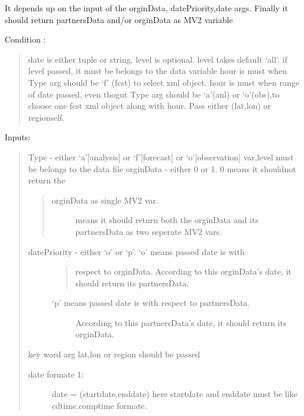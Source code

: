 \documentclass[letterpaper,10pt,english]{sphinxmanual}
\begin{document}
\begin{fulllineitems}
\begin{fulllineitems}
It depends up on the input of the orginData, datePriority,date args.
Finally it should return partnersData and/or orginData as MV2 variable

Condition :
\begin{quote}

date is either tuple or string.
level is optional. level takes default `all'.
if level passed, it must be belongs to the data variable
hour is must when Type arg should be `f' (fcst) to select xml object.
hour is must when range of date passed, even thogut Type arg should
be `a'(anl) or `o'(obs),to choose one fcst xml object along with hour.
Pass either (lat,lon) or regionself.
\end{quote}

Inputs:
\begin{quote}

Type - either `a'{[}analysis{]} or `f'{[}forecast{]} or `o'{[}observation{]}
var,level must be belongs to the data file
orginData - either 0 or 1. 0 means it shouldnot return the
\begin{quote}
\begin{description}
\item[{orginData as single MV2 var.}]  means it should return both the orginData and its
partnersData as two seperate MV2 vars.

\end{description}
\end{quote}
\begin{description}
\item[{datePriority - either `o' or `p'. `o' means passed date is with}] \leavevmode\begin{quote}

respect to orginData. According to this
orginData's date, it should return its partnersData.
\end{quote}
\begin{description}
\item[{`p' means passed date is with respect to partnersData.}] \leavevmode
According to this partnersData's date, it should
return its orginData.

\end{description}

\end{description}

key word arg lat,lon or region should be passed
\begin{description}
\item[{date formate 1:}] \leavevmode
date = (startdate,enddate)
here startdate and enddate must be like cdtime.comptime formate.


\end{description}
\end{quote}
\end{fulllineitems}
\end{fulllineitems}
\end{document}
